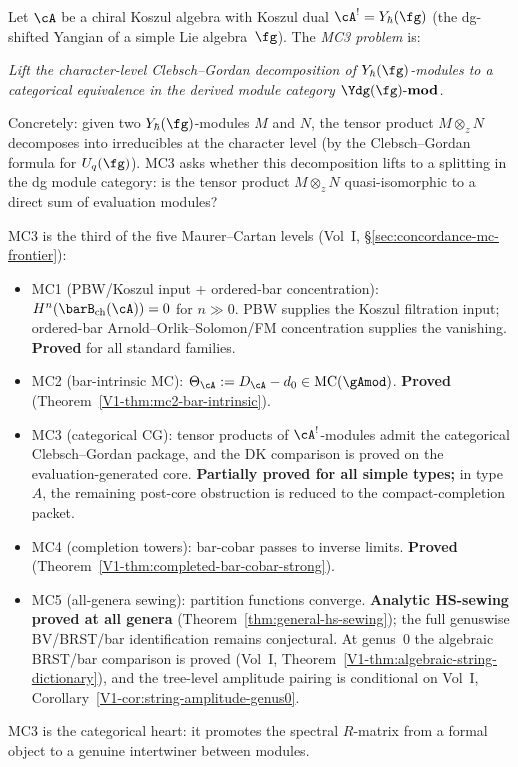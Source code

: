 \begin{definition}
Let $\cA$ be a chiral Koszul algebra with Koszul dual
$\cA^!=Y_\hbar(\fg)$ (the dg-shifted Yangian of a simple
Lie algebra~$\fg$). The \emph{MC3 problem} is:

\emph{Lift the character-level Clebsch--Gordan
decomposition of $Y_\hbar(\fg)$-modules to a categorical
equivalence in the derived module category
$\Ydg(\fg)\text{-}\mathbf{mod}$.}

Concretely: given two $Y_\hbar(\fg)$-modules $M$ and $N$,
the tensor product $M\otimes_z N$ decomposes into
irreducibles at the character level
(by the Clebsch--Gordan formula for $U_q(\fg)$).
MC3 asks whether this decomposition lifts to a
splitting in the dg module category: is the
tensor product $M\otimes_z N$ quasi-isomorphic to a
direct sum of evaluation modules?
\end{definition}

\begin{remark}
MC3 is the third of the five Maurer--Cartan levels
(Vol~I, \S\ref*{sec:concordance-mc-frontier}):
\begin{itemize}
\item MC1 (PBW/Koszul input + ordered-bar concentration):
 $H^n(\barB_{\mathrm{ch}}(\cA))=0$ for $n\gg 0$. PBW supplies the
 Koszul filtration input; ordered-bar Arnold--Orlik--Solomon/FM
 concentration supplies the vanishing. \textbf{Proved} for all
 standard families.
\item MC2 (bar-intrinsic MC): $\Theta_\cA:=D_\cA-d_0
 \in\mathrm{MC}(\gAmod)$. \textbf{Proved}
 (Theorem~\ref*{V1-thm:mc2-bar-intrinsic}).
\item MC3 (categorical CG): tensor products of
 $\cA^!$-modules admit the categorical Clebsch--Gordan package, and
 the DK comparison is proved on the evaluation-generated core.
 \textbf{Partially proved for all simple types;} in type~$A$, the
 remaining post-core obstruction is reduced to the
 compact-completion packet.
\item MC4 (completion towers): bar-cobar passes to
 inverse limits. \textbf{Proved}
 (Theorem~\ref*{V1-thm:completed-bar-cobar-strong}).
\item MC5 (all-genera sewing): partition functions converge.
 \textbf{Analytic HS-sewing proved at all genera}
 (Theorem~\ref*{thm:general-hs-sewing});
 the full genuswise BV/BRST/bar identification remains
 conjectural. At genus~$0$ the algebraic BRST/bar comparison
 is proved
 (Vol~I, Theorem~\ref*{V1-thm:algebraic-string-dictionary}),
 and the tree-level amplitude pairing is conditional on
 Vol~I, Corollary~\ref*{V1-cor:string-amplitude-genus0}.
\end{itemize}
MC3 is the categorical heart: it promotes the spectral
$R$-matrix from a formal object to a genuine
intertwiner between modules.
\end{remark}

